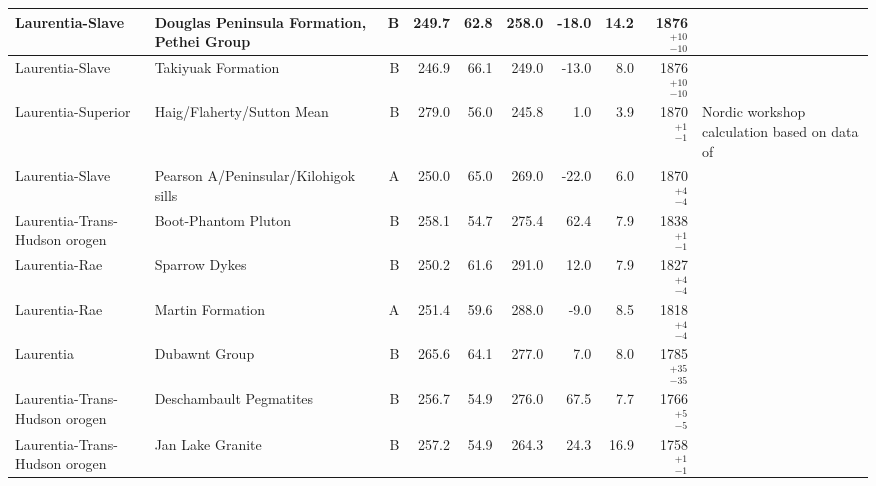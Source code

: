\begin{longtable}{p{1 in}p{1 in}rrrrrrrp{1.5 in}}
               Laurentia-Slave &        Douglas Peninsula Formation, Pethei Group &      B &     249.7 &      62.8 & 258.0 & -18.0 &      14.2 &   1876$^{+10}_{-10}$ &                                \cite{Irving1979a} \\ \hline
               Laurentia-Slave &                               Takiyuak Formation &      B &     246.9 &      66.1 & 249.0 & -13.0 &       8.0 &   1876$^{+10}_{-10}$ &                                \cite{Irving1979a} \\ \hline
            Laurentia-Superior &                       Haig/Flaherty/Sutton Mean  &      B &     279.0 &      56.0 & 245.8 &   1.0 &       3.9 &     1870$^{+1}_{-1}$ &  Nordic workshop calculation based on data of \cite{Schmidt1980a, Schwarz1982a} \\ \hline
               Laurentia-Slave &             Pearson A/Peninsular/Kilohigok sills &      A &     250.0 &      65.0 & 269.0 & -22.0 &       6.0 &     1870$^{+4}_{-4}$ &                               \cite{Mitchell2010c} \\ \hline
 Laurentia-Trans-Hudson orogen &                              Boot-Phantom Pluton &      B &     258.1 &      54.7 & 275.4 &  62.4 &       7.9 &     1838$^{+1}_{-1}$ &                                 \cite{Symons1999a} \\ \hline
                 Laurentia-Rae &                                    Sparrow Dykes &      B &     250.2 &      61.6 & 291.0 &  12.0 &       7.9 &     1827$^{+4}_{-4}$ &                                \cite{McGlynn1974a} \\ \hline
                 Laurentia-Rae &                                 Martin Formation &      A &     251.4 &      59.6 & 288.0 &  -9.0 &       8.5 &     1818$^{+4}_{-4}$ &                                  \cite{Evans1973a} \\ \hline
                     Laurentia &                                    Dubawnt Group &      B &     265.6 &      64.1 & 277.0 &   7.0 &       8.0 &   1785$^{+35}_{-35}$ &                                    \cite{Park1973} \\ \hline
 Laurentia-Trans-Hudson orogen &                          Deschambault Pegmatites &      B &     256.7 &      54.9 & 276.0 &  67.5 &       7.7 &     1766$^{+5}_{-5}$ &                                 \cite{Symons2000a} \\ \hline
 Laurentia-Trans-Hudson orogen &                                 Jan Lake Granite &      B &     257.2 &      54.9 & 264.3 &  24.3 &      16.9 &     1758$^{+1}_{-1}$ &                                   \cite{Gala1995a} \\ \hline

\end{longtable}

